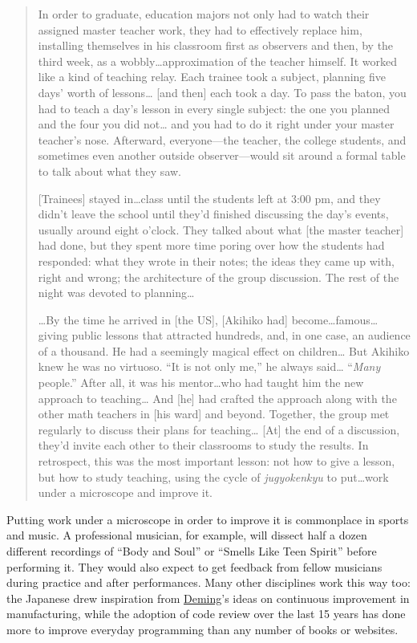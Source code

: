 \begin{quote}
In order to graduate, education majors not only had to watch their
assigned master teacher work, they had to effectively replace him,
installing themselves in his classroom first as observers and then, by
the third week, as a wobbly\ldots{}approximation of the teacher himself.
It worked like a kind of teaching relay. Each trainee took a subject,
planning five days' worth of lessons\ldots{} {[}and then{]} each took a
day. To pass the baton, you had to teach a day's lesson in every single
subject: the one you planned and the four you did not\ldots{} and you
had to do it right under your master teacher's nose. Afterward,
everyone---the teacher, the college students, and sometimes even another
outside observer---would sit around a formal table to talk about what
they saw.

{[}Trainees{]} stayed in\ldots{}class until the students left at 3:00
pm, and they didn't leave the school until they'd finished discussing
the day's events, usually around eight o'clock. They talked about what
{[}the master teacher{]} had done, but they spent more time poring over
how the students had responded: what they wrote in their notes; the
ideas they came up with, right and wrong; the architecture of the group
discussion. The rest of the night was devoted to planning\ldots{}

\ldots{}By the time he arrived in {[}the US{]}, {[}Akihiko had{]}
become\ldots{}famous\ldots{} giving public lessons that attracted
hundreds, and, in one case, an audience of a thousand. He had a
seemingly magical effect on children\ldots{} But Akihiko knew he was no
virtuoso. ``It is not only me,'' he always said\ldots{} ``\emph{Many}
people.'' After all, it was his mentor\ldots{}who had taught him the new
approach to teaching\ldots{} And {[}he{]} had crafted the approach along
with the other math teachers in {[}his ward{]} and beyond. Together, the
group met regularly to discuss their plans for teaching\ldots{} {[}At{]}
the end of a discussion, they'd invite each other to their classrooms to
study the results. In retrospect, this was the most important lesson:
not how to give a lesson, but how to study teaching, using the cycle of
\emph{jugyokenkyu} to put\ldots{}work under a microscope and improve it.
\end{quote}

Putting work under a microscope in order to improve it is commonplace in
sports and music. A professional musician, for example, will dissect
half a dozen different recordings of ``Body and Soul'' or ``Smells Like
Teen Spirit'' before performing it. They would also expect to get
feedback from fellow musicians during practice and after performances.
Many other disciplines work this way too: the Japanese drew inspiration
from \href{https://en.wikipedia.org/wiki/W._Edwards_Deming}{Deming}'s
ideas on continuous improvement in manufacturing, while the adoption of
code review over the last 15 years has done more to improve everyday
programming than any number of books or websites.

